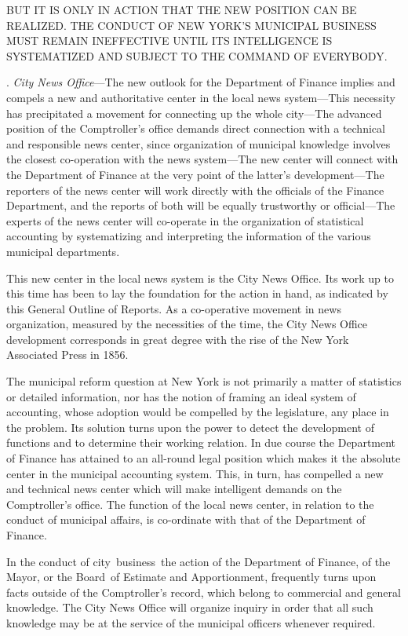 \documentclass[twoside,symmetric,nobib,justified]{tufte-book}
\begin{document}
BUT IT IS ONLY IN ACTION THAT THE NEW POSITION CAN BE REALIZED. THE
CONDUCT OF NEW YORK'S MUNICIPAL BUSINESS MUST REMAIN INEFFECTIVE UNTIL
ITS INTELLIGENCE IS SYSTEMATIZED AND SUBJECT TO THE COMMAND OF
EVERYBODY.~

\vspace{.15in}

. \emph{City News Office}---The new outlook for the Department of
Finance implies and compels a new and authoritative center in the local
news system---This necessity has precipitated a movement for connecting
up the whole city---The advanced position of the Comptroller's office
demands direct connection with a technical and responsible news center,
since organization of municipal knowledge involves the closest
co-operation with the news system---The new center will connect with the
Department of Finance at the very point of the latter's
development---The reporters of the news center will work directly with
the officials of the Finance Department, and the reports of both will be
equally trustworthy or official---The experts of the news center will
co-operate in the organization of statistical accounting by
systematizing and interpreting the information of the various municipal
departments.~

This new center in the local news system is the City News Office. Its
work up to this time has been to lay the foundation for the action in
hand, as indicated by this General Outline of Reports. As a co-operative
movement in news organization, measured by the necessities of the time,
the City News Office development corresponds in great degree with the
rise of the New York Associated Press in 1856.~~

The municipal reform question at New York is not primarily a matter of
statistics or detailed information, nor has the notion of framing an
ideal system of accounting, whose adoption would be compelled by the
legislature, any place in the problem. Its solution turns upon the power
to detect the development of functions and to determine their working
relation. In due course the Department of Finance has attained to an
all-round legal position which makes it the absolute center in the
municipal accounting system. This, in turn, has compelled a new and
technical news center which will make intelligent demands on the
Comptroller's office. The function of the local news center, in relation
to the conduct of municipal affairs, is co-ordinate with that of the
Department of Finance.~

In the conduct of city~business~the action of the Department of Finance,
of the Mayor, or the Board~of Estimate and Apportionment, frequently
turns upon facts outside of the Comptroller's record, which belong to
commercial and general knowledge. The City News Office will organize
inquiry in order that all such knowledge may be at the service of the
municipal officers whenever required.~
\end{document}
